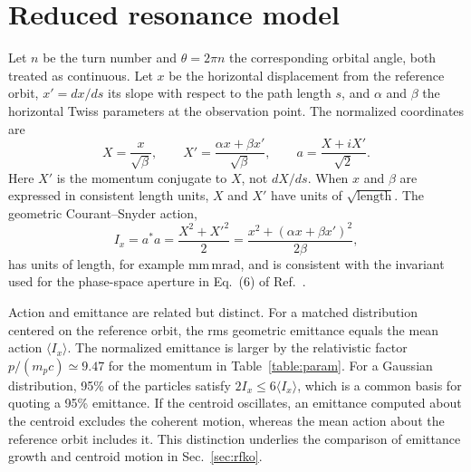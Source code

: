 \documentclass[a4paper,fleqn]{cas-sc}
\begin{document}
\section{\label{sec:model}Reduced resonance model}

Let $n$ be the turn number and $\theta=2\pi n$ the corresponding orbital angle, both treated as continuous. Let $x$ be the horizontal displacement from the reference orbit, $x'=dx/ds$ its slope with respect to the path length $s$, and $\alpha$ and $\beta$ the horizontal Twiss parameters at the observation point. The normalized coordinates are
\begin{equation}
 X=\frac{x}{\sqrt{\beta}},\qquad
 X'=\frac{\alpha x+\beta x'}{\sqrt{\beta}},\qquad
 a=\frac{X+iX'}{\sqrt{2}}.
 \label{eqn:coordinates}
\end{equation}
Here $X'$ is the momentum conjugate to $X$, not $dX/ds$. When $x$ and $\beta$ are expressed in consistent length units, $X$ and $X'$ have units of $\sqrt{\mathrm{length}}$. The geometric Courant--Snyder action,
\begin{equation}
 I_x=a^*a=\frac{X^2+X'^2}{2}
     =\frac{x^2+(\alpha x+\beta x')^2}{2\beta},
 \label{eqn:action}
\end{equation}
has units of length, for example $\mathrm{mm\,mrad}$, and is consistent with the invariant used for the phase-space aperture in Eq.~(6) of Ref.~\cite{mu2e}.

Action and emittance are related but distinct. For a matched distribution centered on the reference orbit, the rms geometric emittance equals the mean action $\langle I_x\rangle$. The normalized emittance is larger by the relativistic factor $p/(m_pc)\simeq9.47$ for the momentum in Table~\ref{table:param}. For a Gaussian distribution, 95\% of the particles satisfy $2I_x\le6\langle I_x\rangle$, which is a common basis for quoting a 95\% emittance. If the centroid oscillates, an emittance computed about the centroid excludes the coherent motion, whereas the mean action about the reference orbit includes it. This distinction underlies the comparison of emittance growth and centroid motion in Sec.~\ref{sec:rfko}.
\end{document}
